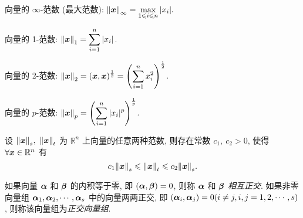 \begin{definition}[最大范数]
    向量的 $\infty$-范数 (最大范数):
    $\displaystyle 
    \norm{\vb*{x}}_{\infty}=\max\limits_{1\leqslant i\leqslant n}|x_i|.
    $
\end{definition}

\begin{definition}[1-范数]
    向量的 1-范数: $ \displaystyle \norm{\vb*{x}}_1=\sum_{i=1}^{n} |x_i| $.
\end{definition}

\begin{definition}[2-范数]
    向量的 2-范数: $ \displaystyle \norm{\vb*{x}}_2=(\vb*{x},\vb*{x})^{\frac{1}{2}} =\qty(\sum_{i=1}^{n} x_i^2)^{\frac{1}{2}}$.
\end{definition}

\begin{definition}[$p$-范数]
    向量的 $p$-范数: $ \displaystyle \norm{\vb*{x}}_{p}=\qty(\sum_{i=1}^{n} |x_i|^p)^{\frac{1}{p}} $.
\end{definition}

\begin{theorem}[向量范数的等价性]
    设 $\norm{\vb*{x}}_s,~\norm{\vb*{x}}_t$ 为 $\mathbb{R}^{n}$ 上向量的任意两种范数, 则存在常数 $c_1,~c_2>0$, 使得 $\forall \vb*{x}\in \mathbb{R}^{n}$ 有 $$
    c_1\norm{\vb*{x}}_s\leqslant \norm{\vb*{x}}_t\leqslant c_2\norm{\vb*{x}}_s.
    $$
\end{theorem}


\begin{definition}[向量的正交]
    如果向量 $ \vb*{\alpha} $ 和 $ \vb*{\beta} $ 的内积等于零, 即 $ (\vb*{\alpha}, \vb*{\beta})=0 $, 则称  $\vb*{\alpha} $ 和 $ \vb*{\beta} $ \textit{相互正交}. 如果非零向量组 $ \vb*{\alpha}_{1}, \vb*{\alpha}_{2}, \cdots, \vb*{\alpha}_{s} $ 中的向量两两正交, 即 $ \left(\vb*{\alpha}_{i}, \vb*{\alpha}_{j}\right)=0(i \neq j, i, j=1 ,  2, \cdots, s) $, 则称该向量组为\textit{正交向量组}.
\end{definition}

